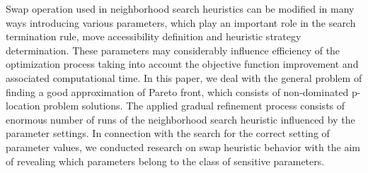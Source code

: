
\begin{Abstrakt}
    Swap operation used in neighborhood search heuristics can be modified in many ways introducing various parameters, which play an important role in the search termination rule, move accessibility definition and heuristic strategy determination. These parameters may considerably influence efficiency of the optimization process taking into account the objective function improvement and associated computational time. In this paper, we deal with the general problem of finding a good approximation of Pareto front, which consists of non-dominated p-location problem solutions. The applied gradual refinement process consists of enormous number of runs of the neighborhood search heuristic influenced by the parameter settings. In connection with the search for the correct setting of parameter values, we conducted research on swap heuristic behavior with the aim of revealing which parameters belong to the class of sensitive parameters.
\end{Abstrakt}



\clearpage